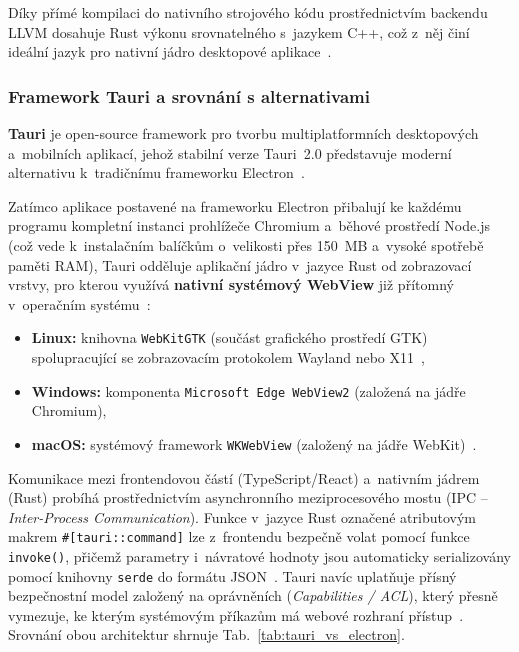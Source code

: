 \documentclass[12pt, a4paper, oneside]{article}
\begin{document}
Díky přímé kompilaci do nativního strojového kódu prostřednictvím backendu LLVM dosahuje Rust výkonu srovnatelného s~jazykem C++, což z~něj činí ideální jazyk pro nativní jádro desktopové aplikace~\cite{rust_book}.

\subsubsection{Framework Tauri a srovnání s alternativami}
\label{sec:teorie_tauri}

\textbf{Tauri} je open-source framework pro tvorbu multiplatformních desktopových a~mobilních aplikací, jehož stabilní verze Tauri~2.0 představuje moderní alternativu k~tradičnímu frameworku Electron~\cite{tauri_docs}.

Zatímco aplikace postavené na frameworku Electron přibalují ke každému programu kompletní instanci prohlížeče Chromium a~běhové prostředí Node.js (což vede k~instalačním balíčkům o~velikosti přes 150~MB a~vysoké spotřebě paměti RAM), Tauri odděluje aplikační jádro v~jazyce Rust od zobrazovací vrstvy, pro kterou využívá \textbf{nativní systémový WebView} již přítomný v~operačním systému~\cite{tauri_docs}:
\begin{itemize}
    \item \textbf{Linux:} knihovna \texttt{WebKitGTK} (součást grafického prostředí GTK) spolupracující se zobrazovacím protokolem Wayland nebo X11~\cite{tauri_docs, wayland_docs},
    \item \textbf{Windows:} komponenta \texttt{Microsoft Edge WebView2} (založená na jádře Chromium),
    \item \textbf{macOS:} systémový framework \texttt{WKWebView} (založený na jádře WebKit)~\cite{tauri_docs}.
\end{itemize}

Komunikace mezi frontendovou částí (TypeScript/React) a~nativním jádrem (Rust) probíhá prostřednictvím asynchronního meziprocesového mostu (IPC -- \textit{Inter-Process Communication}). Funkce v~jazyce Rust označené atributovým makrem \texttt{\#[tauri::command]} lze z~frontendu bezpečně volat pomocí funkce \texttt{invoke()}, přičemž parametry i~návratové hodnoty jsou automaticky serializovány pomocí knihovny \texttt{serde} do formátu JSON~\cite{tauri_docs}. Tauri navíc uplatňuje přísný bezpečnostní model založený na oprávněních (\textit{Capabilities / ACL}), který přesně vymezuje, ke kterým systémovým příkazům má webové rozhraní přístup~\cite{tauri_docs}. Srovnání obou architektur shrnuje Tab.~\ref{tab:tauri_vs_electron}.
\end{document}
